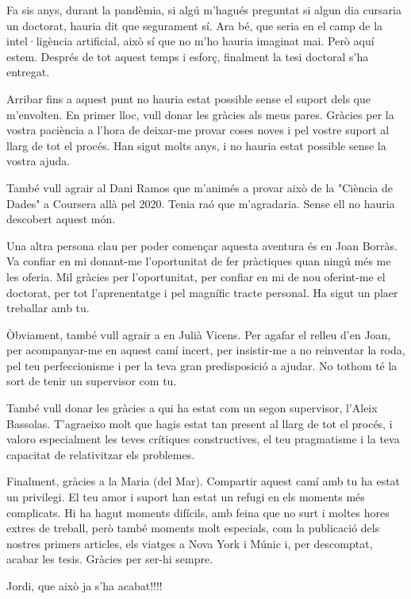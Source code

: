
\begin{acknowledgement}

    Fa sis anys, durant la pandèmia, si algú m'hagués preguntat si algun dia cursaria un doctorat, hauria dit que segurament sí. Ara bé, que seria en el camp de la intel·ligència artificial, això sí que no m'ho hauria imaginat mai. Però aquí estem. Després de tot aquest temps i esforç, finalment la tesi doctoral s'ha entregat.

    Arribar fins a aquest punt no hauria estat possible sense el suport dels que m'envolten. En primer lloc, vull donar les gràcies als meus pares. Gràcies per la vostra paciència a l'hora de deixar-me provar coses noves i pel vostre suport al llarg de tot el procés. Han sigut molts anys, i no hauria estat possible sense la vostra ajuda. 
    
    També vull agrair al Dani Ramos que m'animés a provar això de la "Ciència de Dades" a Coursera allà pel 2020. Tenia raó que m'agradaria. Sense ell no hauria descobert aquest món. 
    
    Una altra persona clau per poder començar aquesta aventura és en Joan Borràs. Va confiar en mi donant-me l'oportunitat de fer pràctiques quan ningú més me les oferia. Mil gràcies per l'oportunitat, per confiar en mi de nou oferint-me el doctorat, per tot l'aprenentatge i pel magnífic tracte personal. Ha sigut un plaer treballar amb tu.

    Òbviament, també vull agrair a en Julià Vicens. Per agafar el relleu d'en Joan, per acompanyar-me en aquest camí incert, per insistir-me a no reinventar la roda, pel teu perfeccionisme i per la teva gran predisposició a ajudar. No tothom té la sort de tenir un supervisor com tu.

    També vull donar les gràcies a qui ha estat com un segon supervisor, l'Aleix Bassolas. T'agraeixo molt que hagis estat tan present al llarg de tot el procés, i valoro especialment les teves crítiques constructives, el teu pragmatisme i la teva capacitat de relativitzar els problemes.
    
    Finalment, gràcies a la Maria (\footnotesize{del Mar})\normalsize{. Compartir aquest camí amb tu ha estat un privilegi. El teu amor i suport han estat un refugi en els moments més complicats. Hi ha hagut moments difícils, amb feina que no surt i moltes hores extres de treball, però també moments molt especials, com la publicació dels nostres primers articles, els viatges a Nova York i Múnic i, per descomptat, acabar les tesis. Gràcies per ser-hi sempre.}

    Jordi, que això ja s'ha acabat!!!!

\end{acknowledgement}

